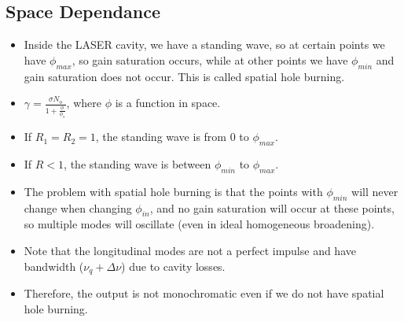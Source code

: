 \documentclass[11pt]{article}
\begin{document}
\subsection{Space Dependance}
\begin{itemize}
    \item Inside the LASER cavity, we have a standing wave, so at certain points we have $\phi_{max}$, so gain saturation occurs, while at other points we have $\phi_{min}$ and gain saturation does not occur. This is called spatial hole burning.
    \item $\gamma = \frac{\sigma N_o}{1 + \frac{\phi}{\phi_s}}$, where $\phi$ is a function in space.
    \item If $R_1 = R_2 = 1$, the standing wave is from $0$ to $\phi_{max}$.
    \item If $R < 1$, the standing wave is between $\phi_{min}$ to $\phi_{max}$.
    \item The problem with spatial hole burning is that the points with $\phi_{min}$ will never change when changing $\phi_{in}$, and no gain saturation will occur at these points, so multiple modes will oscillate (even in ideal homogeneous broadening).
    \item Note that the longitudinal modes are not a perfect impulse and have bandwidth ($\nu_q + \Delta \nu$) due to cavity losses.
    \item Therefore, the output is not monochromatic even if we do not have spatial hole burning.
\end{itemize}
\end{document}
